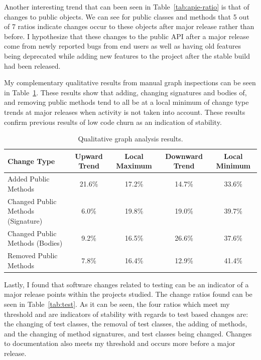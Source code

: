 Another interesting trend that can been seen in Table~\ref{tab:apie-ratio} is that of changes to public objects. We can see for public classes and methods that
5 out of 7 ratios indicate changes occur to these objects after major release rather than before. I hypothesize that these changes to the public API
after a major release come from newly reported bugs from end users as well as having old features being deprecated while adding new features to the project
after the stable build had been released.

My complementary qualitative results from manual graph inspections can be seen in Table~\ref{tab:qual}. These results show that adding, changing signatures
and bodies of, and removing public methods tend to all be at a local minimum of change type trends at major releases when activity is not taken into
account. These results confirm previous results of low code churn as an indication of stability.

\begin{table}[ht]
\begin{center}
\begin{tabular}{| p{2cm} | c | c | c | c |}
\hline
Change Type & Upward Trend & Local Maximum & Downward Trend & Local Minimum\\
\hline
Added Public Methods & 21.6\% & 17.2\% & 14.7\% & 33.6\% \\ \hline
Changed Public Methods (Signature) & 6.0\% & 19.8\% & 19.0\% & 39.7\% \\ \hline
Changed Public Methods (Bodies) & 9.2\% & 16.5\% & 26.6\% & 37.6\% \\ \hline
Removed Public Methods & 7.8\% & 16.4\% & 12.9\% & 41.4\% \\ \hline
\end{tabular}
\end{center}
\caption{Qualitative graph analysis results. \label{tab:qual}}
\end{table}

Lastly, I found that software changes related to testing can be an indicator of a major release points within the projects studied. The change
ratios found can be seen in Table~\ref{tab:test}. As it can be seen, the four ratios which meet my threshold and are indicators of stability with regards to test based
changes are: the changing of test classes, the removal of test classes, the adding of methods, and the changing of method signatures, and test classes being changed.
Changes to documentation also meets my threshold and occurs more before a major release.

